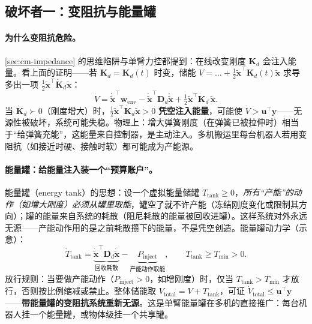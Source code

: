 \subsection{破坏者一：变阻抗与能量罐}
\label{sec:cm-passivity-tank}
\paragraph{为什么变阻抗危险。}
\cref{sec:cm-impedance} 的思维陷阱与单臂力控都提到：在线改变刚度 $\mathbf{K}_d$ 会注入能量。看上面的证明——若 $\mathbf{K}_d=\mathbf{K}_d(t)$ 时变，储能 $V=\dots+\frac12\tilde{\mathbf{x}}^\top\mathbf{K}_d(t)\tilde{\mathbf{x}}$ 求导多出一项 $\frac12\tilde{\mathbf{x}}^\top\dot{\mathbf{K}}_d\tilde{\mathbf{x}}$：
\begin{equation}
  \dot V=\dot{\tilde{\mathbf{x}}}^\top\mathbf{w}_{\text{env}}-\dot{\tilde{\mathbf{x}}}^\top\mathbf{D}_d\dot{\tilde{\mathbf{x}}}+\tfrac12\tilde{\mathbf{x}}^\top\dot{\mathbf{K}}_d\,\tilde{\mathbf{x}}.
  \label{eq:cm-varimp}
\end{equation}
当 $\dot{\mathbf{K}}_d\succ 0$（刚度增大）时，$\frac12\tilde{\mathbf{x}}^\top\dot{\mathbf{K}}_d\tilde{\mathbf{x}}>0$ \textbf{凭空注入能量}，可能使 $\dot V>\mathbf{u}^\top\mathbf{y}$——无源性被破坏，系统可能失稳。物理上：增大弹簧刚度（在弹簧已被拉伸时）相当于“给弹簧充能”，这能量来自控制器，是主动注入。多机搬运里每台机器人若用变阻抗（如接近时硬、接触时软）都可能成为产能源。

\paragraph{能量罐：给能量注入装一个“预算账户”。}
能量罐（energy tank）的思想：设一个虚拟能量储罐 $T_{\text{tank}}\ge 0$，\emph{所有“产能”的动作（如增大刚度）必须从罐里取能}，罐空了就不许产能（冻结刚度变化或限制其方向）；罐的能量来自系统的耗散（阻尼耗散的能量被回收进罐）。这样系统对外永远无源——产能动作用的是之前耗散攒下的能量，不是凭空创造。能量罐动力学（示意）：
\begin{equation}
  \dot T_{\text{tank}}=\underbrace{\dot{\tilde{\mathbf{x}}}^\top\mathbf{D}_d\dot{\tilde{\mathbf{x}}}}_{\text{回收耗散}}-\underbrace{P_{\text{inject}}}_{\text{产能动作取能}},\qquad T_{\text{tank}}\ge T_{\min}>0.
  \label{eq:cm-tank}
\end{equation}
放行规则：当要做产能动作（$P_{\text{inject}}>0$，如增刚度）时，仅当 $T_{\text{tank}}>T_{\min}$ 才放行，否则按比例缩减或禁止。整体储能取 $V_{\text{total}}=V+T_{\text{tank}}$，可证 $\dot V_{\text{total}}\le\mathbf{u}^\top\mathbf{y}$——\textbf{带能量罐的变阻抗系统重新无源}。这是单臂能量罐在多机的直接推广：每台机器人挂一个能量罐，或物体级挂一个共享罐。

